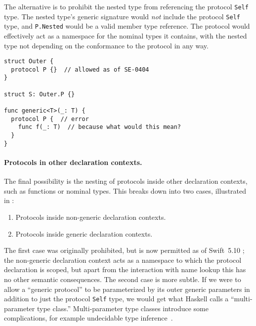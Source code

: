\documentclass[../generics]{subfiles}
\begin{document}
The alternative is to prohibit the nested type from referencing the protocol \texttt{Self} type. The nested type's generic signature would \emph{not} include the protocol \texttt{Self} type, and \texttt{P.Nested} would be a valid member type reference. The protocol would effectively act as a namespace for the nominal types it contains, with the nested type not depending on the conformance to the protocol in any way.

\begin{listing}\label{protocol nested inside type}
\begin{Verbatim}
struct Outer {
  protocol P {}  // allowed as of SE-0404
}

struct S: Outer.P {}

func generic<T>(_: T) {
  protocol P {  // error
    func f(_: T)  // because what would this mean?
  }
}
\end{Verbatim}
\end{listing}

\paragraph{Protocols in other declaration contexts.} The final possibility is the nesting of protocols inside other declaration contexts, such as functions or nominal types. This breaks down into two cases, illustrated in :
\begin{enumerate}
\item Protocols inside non-generic declaration contexts.
\item Protocols inside generic declaration contexts.
\end{enumerate}
The first case was originally prohibited, but is now permitted as of Swift~5.10 \cite{se0404}; the non-generic declaration context acts as a namespace to which the protocol declaration is scoped, but apart from the interaction with name lookup this has no other semantic consequences. The second case is more subtle. If we were to allow a ``generic protocol'' to be parameterized by its outer generic parameters in addition to just the protocol \texttt{Self} type, we would get what Haskell calls a ``multi-parameter type class.'' Multi-parameter type classes introduce some complications, for example undecidable type inference~\cite{mptc}.
\end{document}
